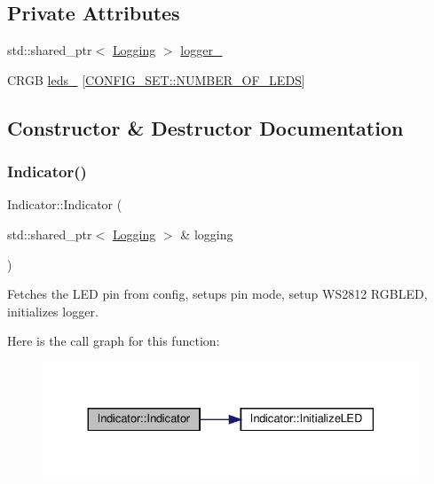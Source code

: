 \subsection*{Private Attributes}
\begin{DoxyCompactItemize}
\item 
std\+::shared\+\_\+ptr$<$ \hyperlink{classLogging}{Logging} $>$ \hyperlink{classIndicator_a52fa4ed25549f6ae99fba1743a15d628}{logger\+\_\+}
\item 
C\+R\+GB \hyperlink{classIndicator_a1b4352e0b1bbed1fa14daf4424120d27}{leds\+\_\+} \mbox{[}\hyperlink{namespaceCONFIG__SET_a91d987372150d727ecbb41b39d482911}{C\+O\+N\+F\+I\+G\+\_\+\+S\+E\+T\+::\+N\+U\+M\+B\+E\+R\+\_\+\+O\+F\+\_\+\+L\+E\+DS}\mbox{]}
\end{DoxyCompactItemize}


\subsection{Constructor \& Destructor Documentation}
\mbox{\label{classIndicator_a88d17656c2aa4c8e16c3b98176318837}} 
\subsubsection{\texorpdfstring{Indicator()}{Indicator()}}
{\footnotesize\ttfamily Indicator\+::\+Indicator (\begin{DoxyParamCaption}\item[{std\+::shared\+\_\+ptr$<$ \hyperlink{classLogging}{Logging} $>$ \&}]{logging }\end{DoxyParamCaption})}



Fetches the L\+ED pin from config, setups pin mode, setup W\+S2812 R\+G\+B\+L\+ED, initializes logger. 

Here is the call graph for this function\+:
\nopagebreak
\begin{figure}[H]
\begin{center}
\leavevmode
\includegraphics[width=330pt]{classIndicator_a88d17656c2aa4c8e16c3b98176318837_cgraph}
\end{center}
\end{figure}
\mbox{\label{classIndicator_a8099ca10ae3ae131b0423899f1abb61c}} 
